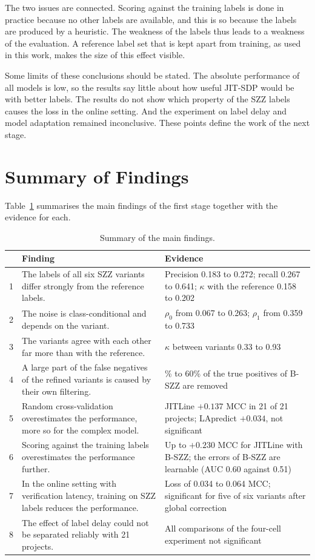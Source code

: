 \documentclass[12pt,a4paper,oneside]{report}
\newcommand{\rhoz}{\rho_0}
\newcommand{\rhoo}{\rho_1}
\begin{document}
The two issues are connected. Scoring against the training labels is done in
practice because no other labels are available, and this is so because the
labels are produced by a heuristic. The weakness of the labels thus leads to
a weakness of the evaluation. A reference label set that is kept apart from
training, as used in this work, makes the size of this effect visible.

Some limits of these conclusions should be stated. The absolute performance
of all models is low, so the results say little about how useful JIT-SDP
would be with better labels. The results do not show which property of the
SZZ labels causes the loss in the online setting. And the experiment on label
delay and model adaptation remained inconclusive. These points define the
work of the next stage.

\section{Summary of Findings}\label{sec:res-summary}

Table~\ref{tab:findings} summarises the main findings of the first stage
together with the evidence for each.

\begin{table}[htbp]
\centering\small
\caption{Summary of the main findings.}
\label{tab:findings}
\begin{tabularx}{\linewidth}{@{}r>{\raggedright\arraybackslash}X>{\raggedright\arraybackslash}X@{}}
\toprule
 & Finding & Evidence \\
\midrule
1 & The labels of all six SZZ variants differ strongly from the reference
labels. & Precision 0.183 to 0.272; recall 0.267 to 0.641; $\kappa$ with the
reference 0.158 to 0.202 \\
2 & The noise is class-conditional and depends on the variant. & $\rhoz$ from
0.067 to 0.263; $\rhoo$ from 0.359 to 0.733 \\
3 & The variants agree with each other far more than with the reference. &
$\kappa$ between variants 0.33 to 0.93 \\
4 & A large part of the false negatives of the refined variants is caused by
their own filtering. & 30\% to 60\% of the true positives of B-SZZ are
removed \\
5 & Random cross-validation overestimates the performance, more so for the
complex model. & JITLine $+0.137$ MCC in 21 of 21 projects; LApredict
$+0.034$, not significant \\
6 & Scoring against the training labels overestimates the performance
further. & Up to $+0.230$ MCC for JITLine with B-SZZ; the errors of B-SZZ are
learnable (AUC 0.60 against 0.51) \\
7 & In the online setting with verification latency, training on SZZ labels
reduces the performance. & Loss of 0.034 to 0.064 MCC; significant for five
of six variants after global correction \\
8 & The effect of label delay could not be separated reliably with 21
projects. & All comparisons of the four-cell experiment not significant \\
\bottomrule
\end{tabularx}
\end{table}
\end{document}
